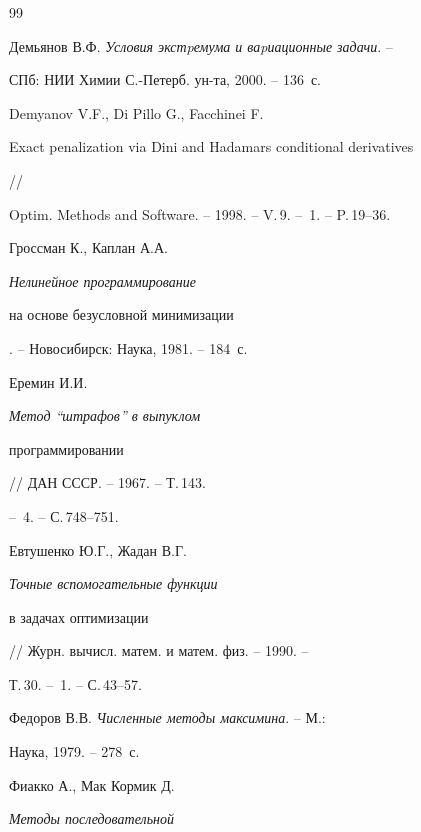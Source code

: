 \begin{thebibliography}{99}







Демьянов В.Ф. {\it Условия экстpемума и ваpиационные задачи}. --


СПб: НИИ Химии С.-Петерб. ун-та, 2000. -- 136~с.







Demyanov V.F., Di Pillo G., Facchinei F. {\it


Exact penalization via Dini and Hadamars conditional derivatives} //


Optim. Methods and Software. -- 1998. -- V.\,9. -- \No\,1. -- P.\,19--36.







Гроссман К., Каплан А.А. {\it Нелинейное программирование


на основе безусловной минимизации}. -- Новосибирск: Наука, 1981. -- 184~с.







Еремин И.И. {\it Метод ``штрафов'' в выпуклом


программировании} // ДАН СССР. -- 1967. -- Т.\,143.


-- \No\,4. -- С.\,748--751.







Евтушенко Ю.Г., Жадан В.Г. {\it Точные вспомогательные функции


в задачах оптимизации} // Журн. вычисл. матем. и матем. физ. -- 1990. --


Т.\,30. -- \No\,1. -- С.\,43--57.







Федоров В.В. {\it Численные методы максимина}. -- М.:


Наука, 1979. -- 278~с.







Фиакко А., Мак Кормик Д. {\it Методы последовательной


}
\end{thebibliography}

